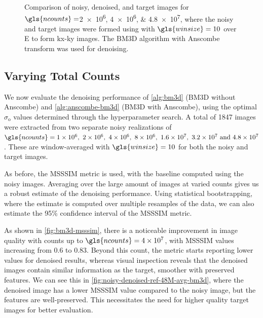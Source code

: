 \begin{figure}
    \caption{Comparison of noisy, denoised, and target images for $\gls{ncounts}=$\numlist{2e6;4e6;4.8e7}, where the noisy and target images were formed using with $\gls{winsize}=\num{10}$ over \gls{E} to form \gls{kx}-\gls{ky} images. The \gls{BM3D} algorithm with Anscombe transform was used for denoising.}
    \label{fig:combined-noisy-denoised}
\end{figure}

\subsection{Varying Total Counts}
We now evaluate the denoising performance of \cref{alg:bm3d} (\gls{BM3D} without Anscombe) and \cref{alg:anscombe-bm3d} (\gls{BM3D} with Anscombe), using the optimal $\sigma_{\text{o}}$ values determined through the hyperparameter search. A total of \num{1847} images were extracted from two separate noisy realizations of $\gls{ncounts}=\numlist{1e6;2e6;4e6;8e6;1.6e7;3.2e7;4.8e7}$. These are window-averaged with $\gls{winsize}=10$ for both the noisy and target images. 

As before, the \gls{MSSSIM} metric is used, with the baseline computed using the noisy images. Averaging over the large amount of images at varied counts gives us a robust estimate of the denoising performance. Using statistical bootstrapping, where the estimate is computed over multiple resamples of the data, we can also estimate the \num{95}\% confidence interval of the \gls{MSSSIM} metric.

As shown in \cref{fig:bm3d-msssim}, there is a noticeable improvement in image quality with counts up to $\gls{ncounts}=\num{4e7}$, with \gls{MSSSIM} values increasing from \num{0.6} to \num{0.83}. Beyond this count, the metric starts reporting lower values for denoised results, whereas visual inspection reveals that the denoised images contain similar information as the target, smoother with preserved features. We can see this in \cref{fig:noisy-denoised-ref-48M-avg-bm3d}, where the denoised image has a lower \gls{MSSSIM} value compared to the noisy image, but the features are well-preserved. This necessitates the need for higher quality target images for better evaluation.

